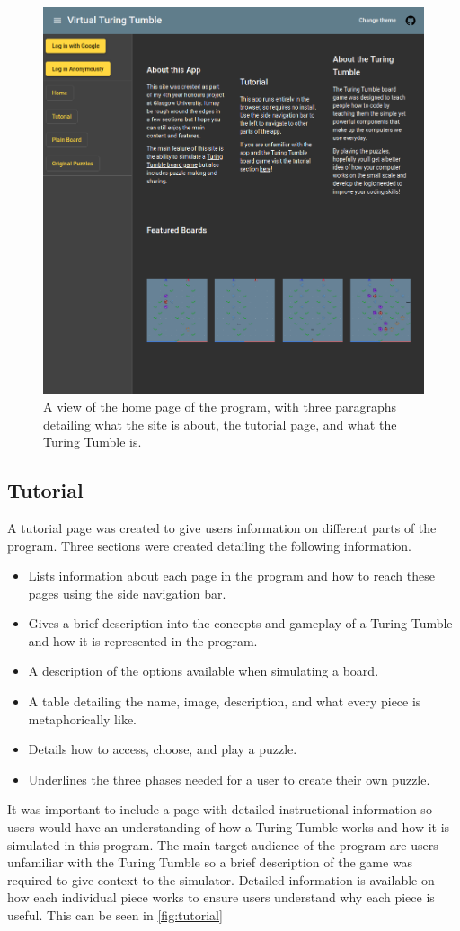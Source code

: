 \documentclass{l4proj}
\begin{document}
\begin{figure}
    \centering
    \includegraphics[width=0.65\linewidth]{images/darkTheme.png}
    \caption{A view of the home page of the program, with three paragraphs detailing what the site is about, the tutorial page, and what the Turing Tumble is.}
    \label{fig:homePage}
\end{figure}

\subsection{Tutorial}
A tutorial page was created to give users information on different parts of the program. Three sections were created detailing the following information.
\begin{itemize}
    \item Lists information about each page in the program and how to reach these pages using the side navigation bar.
    \item Gives a brief description into the concepts and gameplay of a Turing Tumble and how it is represented in the program.
    \item A description of the options available when simulating a board.
    \item A table detailing the name, image, description, and what every piece is metaphorically like.
    \item Details how to access, choose, and play a puzzle.
    \item Underlines the three phases needed for a user to create their own puzzle.
\end{itemize}

It was important to include a page with detailed instructional information so users would have an understanding of how a Turing Tumble works and how it is simulated in this program. The main target audience of the program are users unfamiliar with the Turing Tumble so a brief description of the game was required to give context to the simulator. Detailed information is available on how each individual piece works to ensure users understand why each piece is useful. This can be seen in \ref{fig:tutorial}
\end{document}
